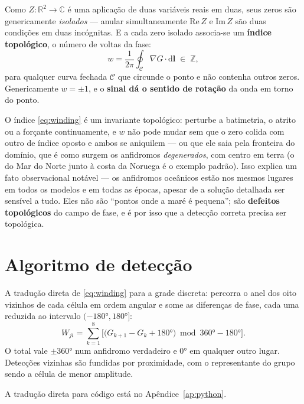 \documentclass[11pt,a4paper,oneside]{report}
\theoremstyle{definition}
\theoremstyle{plain}
\theoremstyle{remark}
\newcommand{\vect}[1]{\bm{#1}}
\newcommand{\dd}{\mathrm{d}}
\begin{document}
Como $Z:\mathbb{R}^{2}\to\mathbb{C}$ é uma aplicação de duas variáveis reais em
duas, seus zeros são genericamente \emph{isolados} — anular simultaneamente
$\mathrm{Re}\,Z$ e $\mathrm{Im}\,Z$ são duas condições em duas incógnitas. E a
cada zero isolado associa-se um \textbf{índice topológico}, o número de voltas
da fase:
\begin{equation}
\boxed{\;
w=\frac{1}{2\pi}\oint_{\mathcal{C}}\nabla G\cdot\dd\vect{l}\;\in\;\mathbb{Z},\;}
\label{eq:winding}
\end{equation}
para qualquer curva fechada $\mathcal{C}$ que circunde o ponto e não contenha
outros zeros. Genericamente $w=\pm 1$, e o \textbf{sinal dá o sentido de
rotação} da onda em torno do ponto.

\begin{caixa}
O índice \eqref{eq:winding} é um invariante topológico: perturbe a batimetria,
o atrito ou a forçante continuamente, e $w$ não pode mudar sem que o zero
colida com outro de índice oposto e ambos se aniquilem — ou que ele saia pela
fronteira do domínio, que é como surgem os anfidromos \emph{degenerados}, com
centro em terra (o do Mar do Norte junto à costa da Noruega é o exemplo
padrão). Isso explica um fato
observacional notável — os anfidromos oceânicos estão nos mesmos lugares em
todos os modelos e em todas as épocas, apesar de a solução detalhada ser
sensível a tudo. Eles não são ``pontos onde a maré é pequena''; são
\textbf{defeitos topológicos} do campo de fase, e é por isso que a detecção
correta precisa ser topológica.
\end{caixa}

\section{Algoritmo de detecção}

A tradução direta de \eqref{eq:winding} para a grade discreta: percorra o anel
dos oito vizinhos de cada célula em ordem angular e some as diferenças de fase,
cada uma reduzida ao intervalo $(-\ang{180},\ang{180}]$:
\begin{equation}
W_{ji}=\sum_{k=1}^{8}
\Big[\big(G_{k+1}-G_{k}+\ang{180}\big)\bmod\ang{360}-\ang{180}\Big].
\end{equation}
O total vale $\pm\ang{360}$ num anfidromo verdadeiro e \ang{0} em qualquer
outro lugar. Detecções vizinhas são fundidas por proximidade, com o
representante do grupo sendo a célula de menor amplitude.

A tradução direta para código está no Apêndice~\ref{ap:python}.
\end{document}
